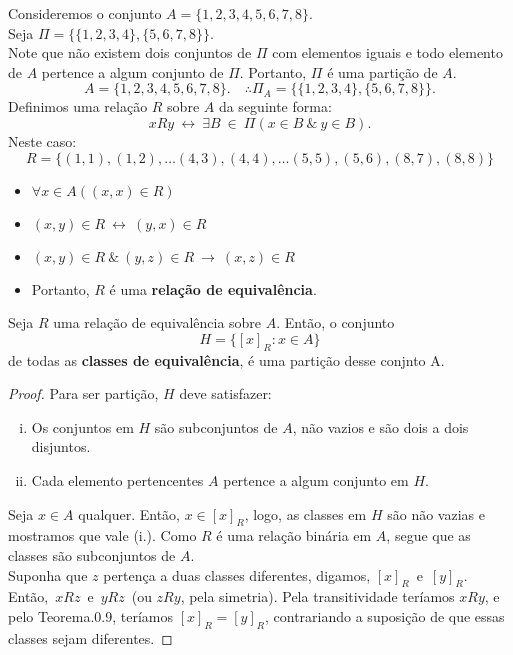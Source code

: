          \begin{exmp}
            Consideremos o conjunto $A = \{1,2,3,4,5,6,7,8\}.$\\
            Seja $\Pi = \{\{1,2,3,4\},\{5,6,7,8\}\}.$\\
            Note que não existem dois conjuntos de $\Pi$ com elementos iguais e todo elemento de $A$ pertence a algum conjunto de $\Pi$. Portanto, $\Pi$ é uma partição de $A$.
            $$A = \{1,2,3,4,5,6,7,8\}.\quad \therefore \Pi_{A} = \{\{1,2,3,4\},\{5,6,7,8\}\}.$$
            Definimos uma relação $R$ sobre $A$ da seguinte forma:
            $$xRy\ \leftrightarrow\ \exists B\ \in\ \Pi (x \in B\ \&\ y \in B).$$
            Neste caso:
            $$R = \{( 1, 1 ) ,( 1, 2 ) , \dots ( 4, 3 ) , ( 4, 4 ) , \dots ( 5, 5 ) , ( 5, 6 ) , ( 8, 7 ) , ( 8, 8 ) \}$$
            \begin{itemize}
               \item $\forall x \in A(( x, x ) \in R)$
               \item $( x, y ) \in R\ \leftrightarrow\ ( y, x ) \in R$
               \item $( x, y ) \in R\ \&\ ( y, z ) \in R\ \rightarrow\ ( x, z ) \in R$
               \item Portanto, $R$ é uma \textbf{relação de equivalência}.
            \end{itemize}    
         \end{exmp}
         \begin{theorem}\label{Particao2}
            Seja $R$ uma relação de equivalência sobre $A$. Então, o conjunto
            $$H = \{[x]_{R}: x \in A\}$$
            de todas as \textbf{classes de equivalência}, é uma partição desse conjnto A.
            \begin{proof}
               Para ser partição, $H$ deve satisfazer:
               \begin{enumerate}[i.]
                  \item Os conjuntos em $H$ são subconjuntos de $A$, não vazios e são dois a dois disjuntos.
                  \item Cada elemento pertencentes $A$ pertence a algum conjunto em $H$.
               \end{enumerate}
               Seja $x \in A$ qualquer. Então, $x \in [x]_{R}$, logo, as classes em $H$ são não vazias e mostramos que vale (i.). Como $R$ é uma relação binária em $A$, segue que as classes são subconjuntos de $A$.\\
               Suponha que $z$ pertença a duas classes diferentes, digamos, $[x]_{R}$\ e\ $[y]_{R}$. Então,\ $xRz$\ e\ $yRz$\ (ou $zRy$, pela simetria). Pela transitividade teríamos $xRy$, e pelo Teorema.0.9, teríamos $[x]_{R} = [y]_{R}$, contrariando a suposição de que essas classes sejam diferentes.
            \end{proof}
         \end{theorem}
